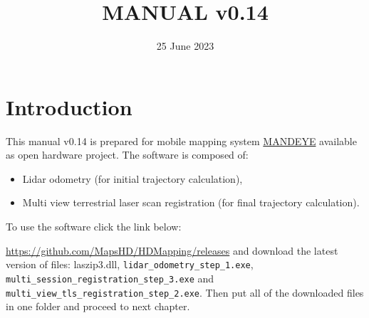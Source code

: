 \documentclass[a4paper,12pt]{book}
\begin{document}
\author{}
\title{MANUAL v0.14}
\date{25 June 2023}

\frontmatter
\maketitle
\tableofcontents

\mainmatter

\chapter{Introduction}
This manual v0.14 is prepared for mobile mapping system \href{https://github.com/JanuszBedkowski/mandeye_controller/blob/main/doc/manual/manual_v0_1/mandeye_dev_manual_v0_1.pdf}{MANDEYE} available as open hardware project.
The software is composed of:
\begin{itemize}
	\item Lidar odometry (for initial trajectory calculation),
	\item Multi view terrestrial laser scan registration (for final trajectory calculation).
\end{itemize}
To use the software click the link below:

\url{https://github.com/MapsHD/HDMapping/releases}
\linebreak
and download the latest version of files: laszip3.dll, \verb|lidar_odometry_step_1.exe|, \verb|multi_session_registration_step_3.exe|  and \verb|multi_view_tls_registration_step_2.exe|.
Then put all of the downloaded files in one folder and proceed to next chapter.











\backmatter
\end{document}

